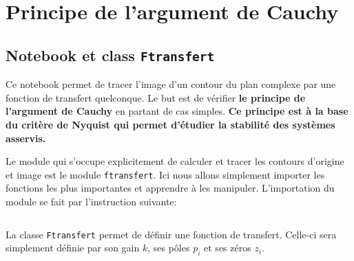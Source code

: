 \chapter{Principe de l'argument de Cauchy~\label{annexe-cauchy}}
\section{Notebook et class \texttt{Ftransfert}
\label{principe-de-largument-de-cauchy}}
Ce notebook permet de tracer l'image d'un contour du plan complexe par
une fonction de transfert quelconque. Le but est de vérifier \textbf{le
principe de l'argument de Cauchy} en partant de cas simples. \textbf{Ce
principe est à la base du critère de Nyquist qui permet d'étudier la
stabilité des systèmes asservis.}
\begin{center}

\end{center}
Le module qui s'occupe explicitement de calculer et tracer les contours
d'origine et image est le module \texttt{ftransfert}.
Ici nous allons simplement importer les fonctions les plus importantes
et apprendre à les manipuler.
L'importation du module se fait par l'instruction suivante:
\begin{tcolorbox}[breakable, size=fbox, boxrule=1pt, 
    pad at break*=1mm,colback=cellbackground, colframe=cellborder]
\inputminted{python}{codes/python/annexe_cauchy_cellule1.py}
\end{tcolorbox}
La classe \texttt{Ftransfert} permet de définir une fonction de
transfert. Celle-ci sera simplement définie par son gain \(k\), ses
pôles \(p_i\) et ses zéros \(z_i\).

